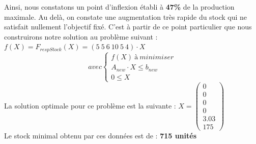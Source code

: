 \documentclass[a4paper, 11pt]{article}
\begin{document}
Ainsi, nous constatons un point d'inflexion établi à \textbf{47\%} de la production maximale. Au delà, on constate une augmentation très rapide du stock qui ne satisfait nullement l'objectif fixé.
C'est à partir de ce point particulier que nous construirons notre solution au problème suivant :
$f(X) = F_{respStock} (X) =(5~5~6~10~5~4)\cdot X$ \\
$$
avec \left\{\begin{split}
	f(X)\ à\ minimiser\\
    A_{new}\cdot X \leq b_{new}\\
    0 \leq X
\end{split}\right.
$$
La solution optimale pour ce problème est la suivante :
$ X =\begin{pmatrix}
0\\
0\\
0\\
0\\
3.03\\
175
\end{pmatrix} $\\
Le stock minimal obtenu par ces données est de : \textbf{715 unités}
\end{document}
